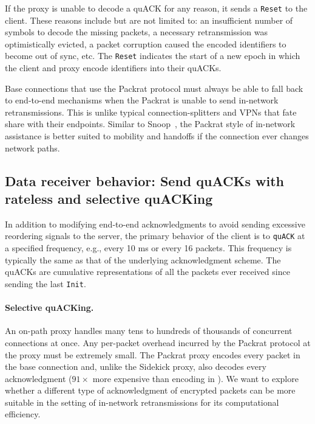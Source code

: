 If the proxy is unable to decode a quACK for any reason, it sends a \texttt
{Reset} to the client. These reasons include but are not limited to: an
insufficient number of symbols to decode the missing packets, a necessary
retransmission was optimistically evicted,
a packet corruption caused the encoded identifiers
to become out of sync, etc. The \texttt{Reset} indicates the start of a new
epoch in which the client and proxy encode identifiers into their quACKs.

Base connections that use the Packrat protocol must always be able to fall back to
end-to-end mechanisms when the Packrat is unable to send in-network
retransmissions. This is unlike typical connection-splitters and VPNs that fate
share with their endpoints. Similar to Snoop~\cite{balakrishnan1995snoop},
the Packrat style of in-network
assistance is better suited to mobility and handoffs if the connection ever
changes network paths.

\subsection{Data receiver behavior: Send quACKs with rateless and selective quACKing}
\label{sec:packrat:protocol:receiver-behavior}

In addition to modifying end-to-end acknowledgments to avoid sending excessive
reordering signals to the server, the primary behavior of the client is
to \texttt{quACK} at a specified frequency, e.g., every 10 ms or every 16
packets. This frequency is typically the same as that of the underlying
acknowledgment scheme. The quACKs are cumulative representations of all the
packets ever received since sending the last \texttt{Init}.

\paragraph{Selective quACKing.}

An on-path proxy handles many tens to hundreds of thousands of concurrent
connections at once. Any per-packet overhead incurred by the Packrat protocol
at the proxy must be extremely small. The Packrat proxy encodes every packet in
the base connection and, unlike the Sidekick proxy, also decodes every
acknowledgment ($91\!\times$ more expensive than encoding in \cite
{yuan2024sidekick}). We want to explore whether a different type of
acknowledgment of encrypted packets can be more suitable in the setting of
in-network retransmissions for its computational efficiency.

